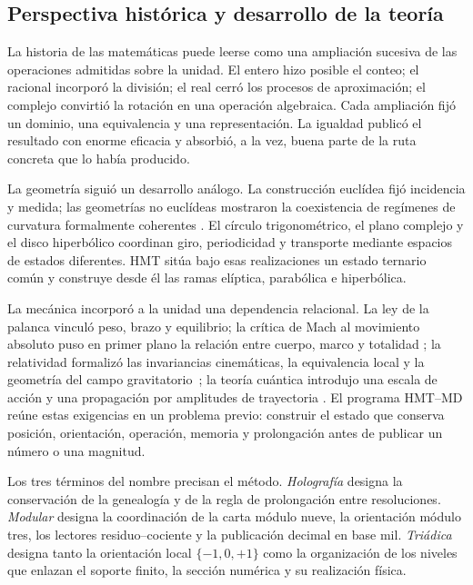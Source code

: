 

\subsection*{Perspectiva histórica y desarrollo de la teoría}

La historia de las matemáticas puede leerse como una ampliación sucesiva de
las operaciones admitidas sobre la unidad. El entero hizo posible el conteo;
el racional incorporó la división; el real cerró los procesos de
aproximación; el complejo convirtió la rotación en una operación algebraica.
Cada ampliación fijó un dominio, una equivalencia y una representación. La
igualdad publicó el resultado con enorme eficacia y absorbió, a la vez, buena
parte de la ruta concreta que lo había producido.

La geometría siguió un desarrollo análogo. La construcción euclídea fijó
incidencia y medida; las geometrías no euclídeas mostraron la coexistencia
de regímenes de curvatura formalmente coherentes
\cite{EuclidElements,PoincareScienceHypothesis}. El círculo trigonométrico,
el plano complejo y el disco hiperbólico coordinan giro, periodicidad y
transporte mediante espacios de estados diferentes. HMT sitúa bajo esas
realizaciones un estado ternario común y construye desde él las ramas
elíptica, parabólica e hiperbólica.

La mecánica incorporó a la unidad una dependencia relacional. La ley de la
palanca vinculó peso, brazo y equilibrio; la crítica de Mach al movimiento
absoluto puso en primer plano la relación entre cuerpo, marco y totalidad
\cite{ArchimedesEquilibrium,MachMechanics}; la relatividad formalizó las
invariancias cinemáticas, la equivalencia local y la geometría del campo
gravitatorio~\cite{Einstein1918Principles}; la teoría cuántica introdujo una
escala de acción y una propagación por amplitudes de trayectoria
\cite{PlanckNobelLecture,Feynman1948}. El programa HMT--MD reúne estas
exigencias en un problema previo: construir el estado que conserva posición,
orientación, operación, memoria y prolongación antes de publicar un número o
una magnitud.

Los tres términos del nombre precisan el método. \emph{Holografía} designa
la conservación de la genealogía y de la regla de prolongación entre
resoluciones. \emph{Modular} designa la coordinación de la carta módulo nueve,
la orientación módulo tres, los lectores residuo--cociente y la publicación
decimal en base mil. \emph{Triádica} designa tanto la orientación local
\(\{-1,0,+1\}\) como la organización de los niveles que enlazan el soporte
finito, la sección numérica y su realización física.

